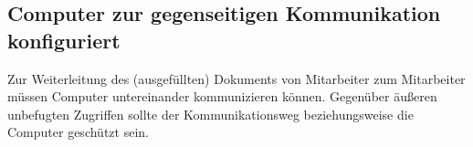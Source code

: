 \subsection{Computer zur gegenseitigen Kommunikation konfiguriert}
Zur Weiterleitung des (ausgefüllten) Dokuments von Mitarbeiter zum Mitarbeiter müssen Computer untereinander kommunizieren können. Gegenüber äußeren unbefugten Zugriffen sollte der Kommunikationsweg beziehungsweise die Computer geschützt sein.